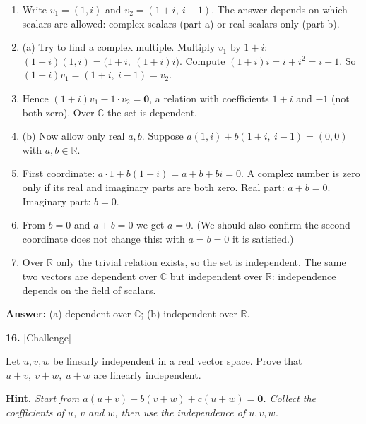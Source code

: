 \documentclass[11pt]{article}
\begin{document}
\begin{tcolorbox}[breakable,colback=ans,colframe=ansb,boxrule=0.5pt,left=4pt,right=4pt,top=2pt,bottom=2pt]\begin{enumerate}[leftmargin=2.2em,itemsep=1pt,topsep=1pt,label=\textbf{Step \arabic*.}]\item Write $v_1=(1,i)$ and $v_2=(1+i,\ i-1)$. The answer depends on which scalars are allowed: complex scalars (part a) or real scalars only (part b).
\item (a) Try to find a complex multiple. Multiply $v_1$ by $1+i$: $(1+i)(1,i)=\big(1+i,\ (1+i)i\big)$. Compute $(1+i)i=i+i^{2}=i-1$. So $(1+i)v_1=(1+i,\ i-1)=v_2$.
\item Hence $(1+i)v_1-1\cdot v_2=\mathbf 0$, a relation with coefficients $1+i$ and $-1$ (not both zero). Over $\mathbb{C}$ the set is dependent.
\item (b) Now allow only real $a,b$. Suppose $a(1,i)+b(1+i,\ i-1)=(0,0)$ with $a,b\in\mathbb{R}$.
\item First coordinate: $a\cdot1+b(1+i)=a+b+bi=0$. A complex number is zero only if its real and imaginary parts are both zero. Real part: $a+b=0$. Imaginary part: $b=0$.
\item From $b=0$ and $a+b=0$ we get $a=0$. (We should also confirm the second coordinate does not change this: with $a=b=0$ it is satisfied.)
\item Over $\mathbb{R}$ only the trivial relation exists, so the set is independent. The same two vectors are dependent over $\mathbb{C}$ but independent over $\mathbb{R}$: independence depends on the field of scalars.
\end{enumerate}\textbf{Answer:} (a) dependent over $\mathbb{C}$; (b) independent over $\mathbb{R}$.\end{tcolorbox}
\par\vspace{2pt}
\begin{minipage}{\linewidth}\textbf{16.} \hfill{\scriptsize\color{ink}[Challenge]}\par\nopagebreak Let $u,v,w$ be linearly independent in a real vector space. Prove that $u+v,\ v+w,\ u+w$ are linearly independent.
\par\smallskip\begingroup\small\color{ink}\textbf{Hint.} \textit{Start from $a(u+v)+b(v+w)+c(u+w)=\mathbf 0$. Collect the coefficients of $u$, $v$ and $w$, then use the independence of $u,v,w$.}\endgroup
\end{minipage}\par\nopagebreak
\end{document}
